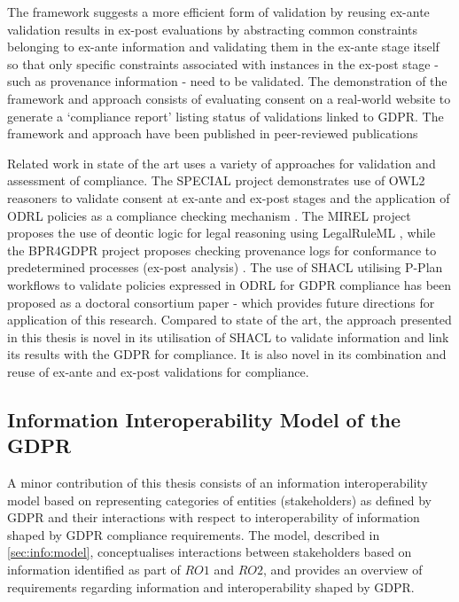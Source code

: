 The framework suggests a more efficient form of validation by reusing ex-ante validation results in ex-post evaluations by abstracting common constraints belonging to ex-ante information and validating them in the ex-ante stage itself so that only specific constraints associated with instances in the ex-post stage - such as provenance information - need to be validated.
The demonstration of the framework and approach consists of evaluating consent on a real-world website to generate a `compliance report' listing status of validations linked to GDPR.
The framework and approach have been published in peer-reviewed publications \cite{pandit_towards_2018,pandit_exploring_2018,pandit_test-driven_2019}

Related work in state of the art uses a variety of approaches for validation and assessment of compliance. The SPECIAL project demonstrates use of OWL2 reasoners to validate consent at ex-ante and ex-post stages \cite{bonatti_fast_2018,dullaert_d3.4_2019} and the application of ODRL policies as a compliance checking mechanism \cite{agarwal_legislative_2018,vos_odrl_2019}. The MIREL project proposes  the use of deontic logic for legal reasoning using LegalRuleML \cite{palmirani_pronto_2018,monica_modelling_2018}, while the BPR4GDPR project proposes checking provenance logs for conformance to predetermined processes (ex-post analysis) \cite{mehr_compliance_2019}.
The use of SHACL utilising P-Plan workflows to validate policies expressed in ODRL for GDPR compliance has been proposed \cite{lieber_policy-compliant_2019} as a doctoral consortium paper - which provides future directions for application of this research.
Compared to state of the art, the approach presented in this thesis is novel in its utilisation of SHACL to validate information and link its results with the GDPR for compliance. It is also novel in its combination and reuse of ex-ante and ex-post validations for compliance.

\subsection{Information Interoperability Model of the GDPR}
A minor contribution of this thesis consists of an information interoperability model based on representing categories of entities (stakeholders) as defined by GDPR and their interactions with respect to interoperability of information shaped by GDPR compliance requirements.
The model, described in \autoref{sec:info:model}, conceptualises interactions between stakeholders based on information identified as part of $RO1$ and $RO2$, and provides an overview of requirements regarding information and interoperability shaped by GDPR.

